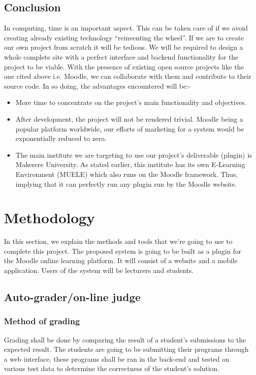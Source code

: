\documentclass[12pt]{article}
\begin{document}
	\subsection{Conclusion}
	In computing, time is an important aspect. This can be taken care of if we avoid creating already existing technology 			“reinventing the wheel”. If we are to create our own project from scratch it will be tedious. We will be required to design a 		whole complete site with a perfect interface and backend functionality for the project to be viable. With the presence of 		existing open source projects like the one cited above i.e. Moodle, we can collaborate with them and contribute to their 			source code. In so doing, the advantages encountered will be:- 
	 \begin{itemize}
			\item More time to concentrate on the project’s main functionality and objectives.
			\item 	After development, the project will not be rendered trivial. Moodle being a popular platform 							worldwide, our efforts of marketing for a system would be exponentially reduced to zero.
			\item	The main institute we are targeting to use our project’s deliverable (plugin) is Makerere University. As 					stated earlier, this institute has its own E-Learning Environment (MUELE) which also runs on the 						Moodle framework. Thus, implying that it can perfectly run any plugin run by the Moodle website.
		\end{itemize}

\newpage

\section{Methodology}
	In this section, we explain the methods and tools that we're going to use to complete this project. The proposed system is going to be built as a plugin for the Moodle online learning platform. It will consist of a website and a mobile application. Users of the system will be lecturers and students.
	\subsection{Auto-grader/on-line judge}
		\subsubsection{Method of grading}
		Grading shall be done by comparing the result of a student's submissions to the expected result. The students are going to be submitting their programs through a web interface, these programs shall be ran in the back-end and tested on various test data to determine the correctness of the student's solution. 
		
\end{document}
